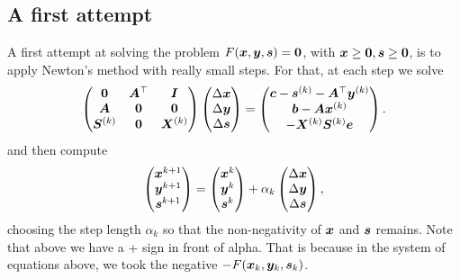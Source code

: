 \subsection{A first attempt}
A first attempt at solving the problem $F(\bm{x},\bm{y},\bm{s})=\bm{0}$, with $\bm{x}\geq \bm{0}, \bm{s}\geq \bm{0}$, is to apply Newton's method with really small steps.
For that, at each step we solve
\begin{equation*}
\begin{pmatrix}
  \bm{0} & \bm{A}^{\top} & \bm{I} \\
  \bm{A} & \bm{0} & \bm{0} \\
  \bm{S}^{(k)} & \bm{0} & \bm{X}^{(k)}
 \end{pmatrix}
\begin{pmatrix} \Delta\bm{x}\\ \Delta \bm{y}\\ \Delta\bm{s} \end{pmatrix} = \begin{pmatrix} \bm{c}-\bm{s}^{(k)}-\bm{A}^{\top}\bm{y}^{(k)}\\ \bm{b}-\bm{A}\bm{x}^{(k)}\\ -\bm{X}^{(k)}\bm{S}^{(k)}\bm{e}\end{pmatrix}.
\end{equation*}
and then compute
\begin{equation*}
\begin{pmatrix} \bm{x}^{k+1}\\ \bm{y}^{k+1}\\ \bm{s}^{k+1}\end{pmatrix}= \begin{pmatrix} \bm{x}^{k}\\ \bm{y}^{k}\\ \bm{s}^{k}\end{pmatrix} +\alpha_k \begin{pmatrix} \Delta\bm{x}\\ \Delta \bm{y}\\ \Delta\bm{s} \end{pmatrix},
 \end{equation*}
 choosing the step length $\alpha_k$ so that the non-negativity of $\bm{x}$ and $\bm{s}$ remains. Note that above we have a + sign in front of alpha. That is because in the system of equations above, we took the negative $-F(\bm{x}_k,\bm{y}_k,\bm{s}_k)$. 

